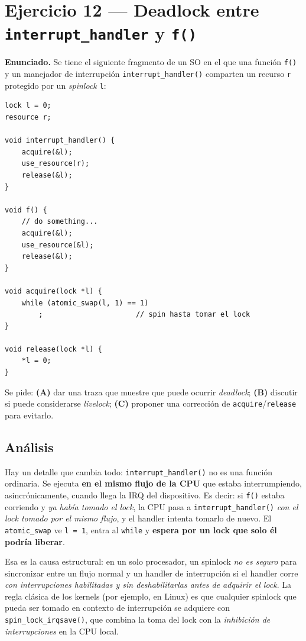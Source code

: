\documentclass[11pt,a4paper]{article}
\begin{document}
\section{Ejercicio 12 --- Deadlock entre \texttt{interrupt\_handler} y \texttt{f()}}

\textbf{Enunciado.} Se tiene el siguiente fragmento de un SO en el que
una función \texttt{f()} y un manejador de interrupción
\texttt{interrupt\_handler()} comparten un recurso \texttt{r} protegido
por un \emph{spinlock} \texttt{l}:

\begin{lstlisting}[style=cstyle]
lock l = 0;
resource r;

void interrupt_handler() {
    acquire(&l);
    use_resource(r);
    release(&l);
}

void f() {
    // do something...
    acquire(&l);
    use_resource(&l);
    release(&l);
}

void acquire(lock *l) {
    while (atomic_swap(l, 1) == 1)
        ;                      // spin hasta tomar el lock
}

void release(lock *l) {
    *l = 0;
}
\end{lstlisting}

Se pide: \textbf{(A)} dar una traza que muestre que puede ocurrir
\emph{deadlock}; \textbf{(B)} discutir si puede considerarse
\emph{livelock}; \textbf{(C)} proponer una corrección de
\texttt{acquire}/\texttt{release} para evitarlo.

\subsection*{Análisis}

Hay un detalle que cambia todo: \texttt{interrupt\_handler()} no es una
función ordinaria. Se ejecuta \textbf{en el mismo flujo de la CPU} que
estaba interrumpiendo, asincrónicamente, cuando llega la IRQ del
dispositivo. Es decir: si \texttt{f()} estaba corriendo y \emph{ya
había tomado el lock}, la CPU pasa a \texttt{interrupt\_handler()}
\emph{con el lock tomado por el mismo flujo}, y el handler intenta
tomarlo de nuevo. El \texttt{atomic\_swap} ve \texttt{l = 1}, entra al
\texttt{while} y \textbf{espera por un lock que solo él podría
liberar}.

Esa es la causa estructural: en un solo procesador, un spinlock
\emph{no es seguro} para sincronizar entre un flujo normal y un handler
de interrupción si el handler corre \emph{con interrupciones
habilitadas y sin deshabilitarlas antes de adquirir el lock}. La regla
clásica de los kernels (por ejemplo, en Linux) es que cualquier
spinlock que pueda ser tomado en contexto de interrupción se adquiere
con \texttt{spin\_lock\_irqsave()}, que combina la toma del lock con la
\emph{inhibición de interrupciones} en la CPU local.
\end{document}
